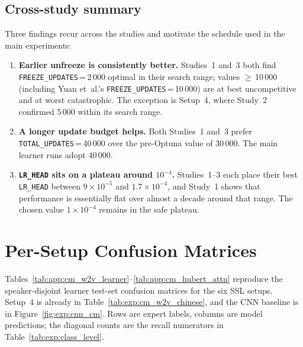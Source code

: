 \subsection{Cross-study summary}
\label{sec:app:sensitivity:summary}

Three findings recur across the studies and motivate the schedule used in
the main experiments:

\begin{enumerate}
  \item \textbf{Earlier unfreeze is consistently better.}
  Studies~1 and~3 both find \texttt{FREEZE\_UPDATES}\,=\,2\,000 optimal in
  their search range; values $\geq$\,10\,000 (including Yuan et~al.'s
  \texttt{FREEZE\_UPDATES}\,=\,10\,000) are at best uncompetitive and at
  worst catastrophic. The exception is Setup~4, where Study~2 confirmed 5\,000
  within its search range.
  \item \textbf{A longer update budget helps.}
  Both Studies~1 and~3 prefer \texttt{TOTAL\_UPDATES}\,=\,40\,000 over the
  pre-Optuna value of 30\,000. The main learner runs adopt 40\,000.
  \item \textbf{\texttt{LR\_HEAD} sits on a plateau around $10^{-4}$.}
  Studies~1--3 each place their best \texttt{LR\_HEAD} between
  $9\times10^{-5}$ and $1.7\times10^{-4}$, and Study~1 shows that
  performance is essentially flat over almost a decade around that range.
  The chosen value $1\times10^{-4}$ remains in the safe plateau.
\end{enumerate}

\section{Per-Setup Confusion Matrices}
\label{sec:app:confusion_matrices}

Tables~\ref{tab:app:cm_w2v_learner}--\ref{tab:app:cm_hubert_attn} reproduce
the speaker-disjoint learner test-set confusion matrices for the six SSL
setups. Setup~4 is already in Table~\ref{tab:exp:cm_w2v_chinese}, and the CNN
baseline is in Figure~\ref{fig:exp:cnn_cm}. Rows are expert labels, columns
are model predictions; the diagonal counts are the recall numerators in
Table~\ref{tab:exp:class_level}.

